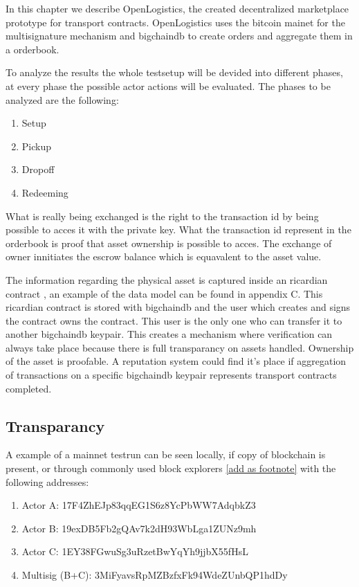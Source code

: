 In this chapter we describe OpenLogistics, the created decentralized  marketplace prototype for transport contracts. OpenLogistics uses the bitcoin mainet for the multisignature mechanism and bigchaindb to create orders and aggregate them in a orderbook. \par

To analyze the results the whole testsetup will be devided into different phases, at every phase the possible actor actions will be evaluated. The phases to be analyzed are the following:
\begin{enumerate}
  \item Setup
  \item Pickup
  \item Dropoff
  \item Redeeming
\end{enumerate}

What is really being exchanged is the right to the transaction id by being possible to acces it with the private key. What the transaction id represent in the orderbook is proof that asset ownership is possible to acces. The exchange of owner innitiates the escrow balance which is equavalent to the asset value.

The information regarding the physical asset is captured inside an ricardian contract \cite{}, an example of the data model can be found in appendix C. This ricardian contract is stored with bigchaindb and the user which creates and signs the contract owns the contract. This user is the only one who can transfer it to another bigchaindb keypair. This creates a mechanism where verification can always take place because there is full transparancy on assets handled. Ownership of the asset is proofable. A reputation system could find it's place if aggregation of transactions on a specific bigchaindb keypair represents transport contracts completed.

\subsection{Transparancy}

A example of a mainnet testrun can be seen locally, if copy of blockchain is present, or through commonly used block explorers \href{https://www.blocktrail.com/BTC}{[add as footnote]}
 with the following addresses:
\begin{enumerate}
  \item Actor A: 17F4ZhEJp83qqEG1S6z8YcPbWW7AdqbkZ3
  \item Actor B: 19exDB5Fb2gQAv7k2dH93WbLga1ZUNz9mh
  \item Actor C: 1EY38FGwuSg3uRzetBwYqYh9jjbX55fHsL
  \item Multisig (B+C): 3MiFyavsRpMZBzfxFk94WdeZUnbQP1hdDy
\end{enumerate}

